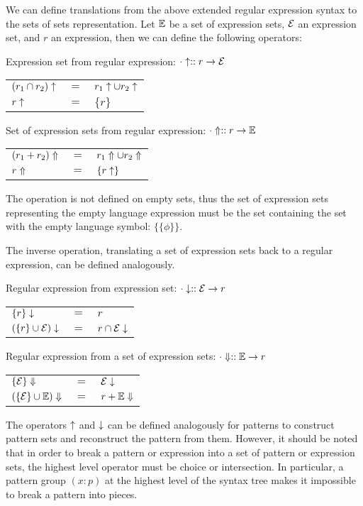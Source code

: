 We can define translations from the above extended regular expression syntax
to the sets of sets representation. Let $\mathbb{E}$ be a set of expression
sets, $\mathcal{E}$ an expression set, and $r$ an expression, then we can
define the following operators:

Expression set from regular expression: $\cdot\uparrow :: r \to \mathcal{E}$

\begin{tabular}{lll}
   $(r_1 \cap r_2)\uparrow$	& $=$	& $r_1\uparrow \cup r_2\uparrow$	\\
   $r\uparrow$			& $=$	& $\{r\}$				\\
\end{tabular}

Set of expression sets from regular expression: $\cdot\Uparrow :: r \to \mathbb{E}$

\begin{tabular}{lll}
   $(r_1 + r_2)\Uparrow$	& $=$	& $r_1\Uparrow \cup r_2\Uparrow$	\\
   $r\Uparrow$		& $=$	& $\{r\uparrow\}$			\\
\end{tabular}

The operation is not defined on empty sets, thus the set of expression sets
representing the empty language expression must be the set containing the set
with the empty language symbol: $\{\{\phi\}\}$.

The inverse operation, translating a set of expression sets back to a regular
expression, can be defined analogously.

Regular expression from expression set: $\cdot\downarrow :: \mathcal{E} \to r$

\begin{tabular}{lll}
   $\{r\}\downarrow$			& $=$	& $r$				\\
   $(\{r\} \cup \mathcal{E})\downarrow$	& $=$	& $r \cap \mathcal{E}\downarrow$	\\
\end{tabular}

Regular expression from a set of expression sets: $\cdot\Downarrow :: \mathbb{E} \to r$

\begin{tabular}{lll}
   $\{\mathcal{E}\}\Downarrow$		& $=$	& $\mathcal{E}\downarrow$		\\
   $(\{\mathcal{E}\} \cup \mathbb{E})\Downarrow$	& $=$	& $r + \mathbb{E}\Downarrow$	\\
\end{tabular}

The operators $\uparrow$ and $\downarrow$ can be defined analogously for
patterns to construct pattern sets and reconstruct the pattern from them.
However, it should be noted that in order to break a pattern or expression
into a set of pattern or expression sets, the highest level operator must be
choice or intersection. In particular, a pattern group $(x:p)$ at the highest
level of the syntax tree makes it impossible to break a pattern into pieces.


